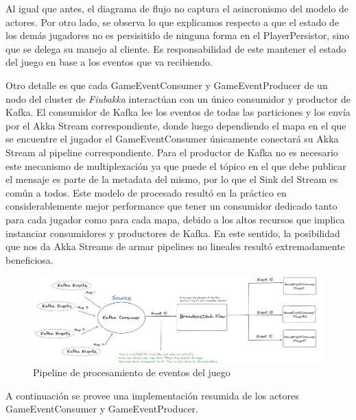 Al igual que antes, el diagrama de flujo no captura el asincronismo del modelo de actores. Por otro lado, se observa lo que explicamos respecto a que el estado de los demás jugadores no es persisitido de ninguna forma en el PlayerPersistor,
sino que se delega su manejo al cliente. Es responsabilidad de este mantener el estado del juego en base a los eventos que va recibiendo.

Otro detalle es que cada GameEventConsumer y GameEventProducer de un nodo del cluster de \textit{Fiubakka} interactúan con un único consumidor y productor de Kafka. El consumidor de Kafka lee los eventos de todas las particiones y los envía por el
Akka Stream correspondiente, donde luego dependiendo el mapa en el que se encuentre el jugador el GameEventConsumer únicamente conectará su Akka Stream al pipeline correspondiente. Para el productor de Kafka no es necesario este mecanismo de multiplexación
ya que puede el tópico en el que debe publicar el mensaje es parte de la metadata del mismo, por lo que el Sink del Stream es común a todos. Este modelo de procesado resultó en la práctico en considerablemente mejor
performance que tener un consumidor dedicado tanto para cada jugador como para cada mapa, debido a los altos recursos que implica instanciar consumidores y productores de Kafka. En este sentido, la posibilidad que nos da Akka Streams de armar pipelines no lineales
resultó extremadamente beneficiosa.

\begin{figure}[htpb]
    \centering
    \includegraphics[width=1\textwidth]{../assets/kafka-consumer-flow.png}
    \caption{Pipeline de procesamiento de eventos del juego}
\end{figure}

A continuación se provee una implementación resumida de los actores GameEventConsumer y GameEventProducer.

